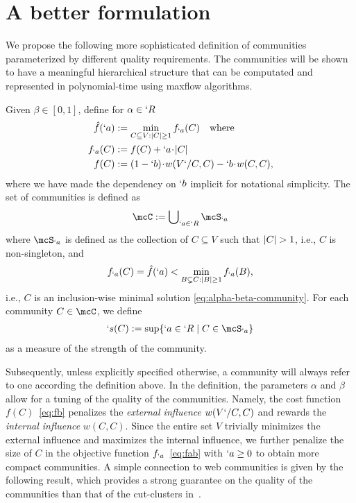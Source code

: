 \section{A better formulation}
\label{sec:problem}
 
We propose the following more sophisticated definition of communities parameterized by different quality requirements. The communities will be shown to have a meaningful hierarchical structure that can be computated and represented in polynomial-time using maxflow algorithms.

\begin{definition}
  \label{def:alpha-beta}
  Given $\beta\in [0,1]$, define for $\alpha\in `R$
        \begin{subequations}
          \label{eq:alpha-beta-community}
          \begin{align}
            \hat{f}(`a)&:=\min_{C\subseteq V:\lvert C\rvert\geq 1} f_{`a}(C) \quad \text{where}\label{eq:fhat}\\
            f_{`a}(C)&:=f(C) + `a \!\cdot\! |C| \label{eq:fab}\\
            f(C)&:=(1-`b)\!\cdot\! w(V`/ C, C) - `b \!\cdot\! w(C,C),\label{eq:fb}
          \end{align}
        \end{subequations}
        where we have made the dependency on $`b$ implicit for notational simplicity. The set of communities is defined as
        \begin{align}
          \mcC := \bigcup\nolimits_{`a\in `R} \mcS_{`a}\label{eq:mcC}
        \end{align}
        where $\mcS_{`a}$ is defined as the collection of $C\subseteq V$ such that $\lvert C\rvert>1$, i.e., $C$ is non-singleton, and
        \begin{align}
          f_{`a}(C)=\hat{f}(`a)< \min_{B\subsetneq C:\lvert B\rvert\geq 1} f_{`a}(B),\label{eq:mcS}
        \end{align}
        i.e., $C$ is an inclusion-wise minimal solution \eqref{eq:alpha-beta-community}. For each community $C\in \mcC$, we define
        \begin{align}
          `s(C) := \sup\Set*{`a\in `R \mid C\in \mcS_{`a}}\label{eq:`s}
        \end{align}
        as a measure of the strength of the community.
\end{definition}

Subsequently, unless explicitly specified otherwise, a community will always refer to one according
the definition above. 
In the definition,
the parameters $\alpha$ and $\beta$ allow for a tuning of the quality of the communities.
Namely, the cost function $f(C)$~\eqref{eq:fb} penalizes the \emph{external influence}
$w(V`/ C, C)$ and rewards the \emph{internal influence} $w(C,C)$. Since the entire set $V$
trivially minimizes the external influence and maximizes the internal influence, we further penalize the
size of $C$ in the objective function $f_{`a}$~\eqref{eq:fab} with $`a\geq 0$ to obtain more compact
communities. A simple connection to web communities is given by the following result, which provides a strong guarantee on the quality of the communities than that of the cut-clusters in~\cite[Lemma~3.1]{flake:cut-clustering}.


